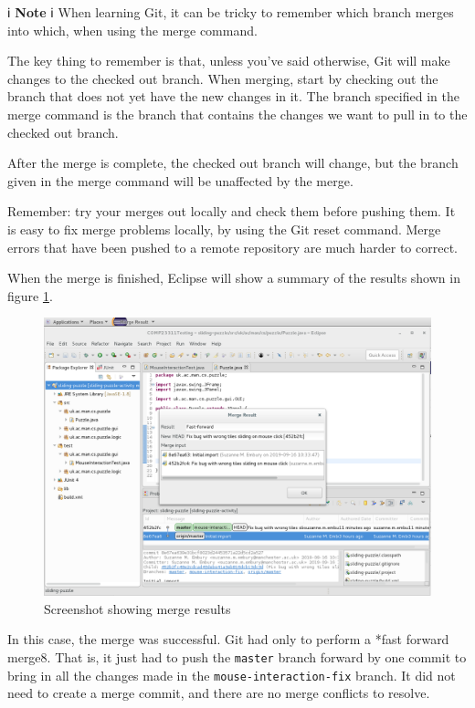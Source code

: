 \documentclass[
]{book}
\begin{document}
ℹ️ \textbf{Note} ℹ️
When learning Git, it can be tricky to remember which branch merges into which, when using the merge command.

The key thing to remember is that, unless you've said otherwise, Git will make changes to the checked out branch. When merging, start by checking out the branch that does not yet have the new changes in it. The branch specified in the merge command is the branch that contains the changes we want to pull in to the checked out branch.

After the merge is complete, the checked out branch will change, but the branch given in the merge command will be unaffected by the merge.

Remember: try your merges out locally and check them before pushing them. It is easy to fix merge problems locally, by using the Git reset command. Merge errors that have been pushed to a remote repository are much harder to correct.

When the merge is finished, Eclipse will show a summary of the results shown in figure \ref{fig:mergeResultShowingSuccessFastForward-fig}.

\begin{figure}

{\centering \includegraphics[width=1\linewidth]{images/mergeResultShowingSuccessFastForward} 

}

\caption{Screenshot showing merge results}\label{fig:mergeResultShowingSuccessFastForward-fig}
\end{figure}

In this case, the merge was successful. Git had only to perform a *fast forward merge8. That is, it just had to push the \texttt{master} branch forward by one commit to bring in all the changes made in the \texttt{mouse-interaction-fix} branch. It did not need to create a merge commit, and there are no merge conflicts to resolve.
\end{document}
